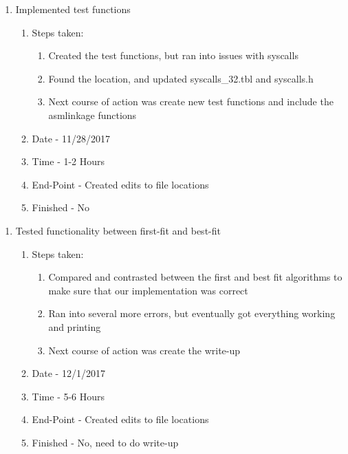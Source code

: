 \documentclass[journal,10pt,onecolumn,compsoc]{IEEEtran} \usepackage[margin=1.0in]{geometry} \usepackage{pdfpages}
\begin{document}
    \begin {enumerate}
    	\item Implemented test functions
        \begin{enumerate}
            \item Steps taken:
        	\begin{enumerate}
                  \item Created the test functions, but ran into issues with syscalls
                  \item Found the location, and updated syscalls\_32.tbl and syscalls.h
                  \item Next course of action was create new test functions and include the asmlinkage functions
     		\end{enumerate}   
            \item Date - 11/28/2017
            \item Time - 1-2 Hours
            \item End-Point - Created edits to file locations
            \item Finished - No  \\
        \end{enumerate}
	\end{enumerate}
    
    \begin {enumerate}
    	\item Tested functionality between first-fit and best-fit
        \begin{enumerate}
            \item Steps taken:
        	\begin{enumerate}
                  \item Compared and contrasted between the first and best fit algorithms to make sure that our implementation was correct
                  \item Ran into several more errors, but eventually got everything working and printing
                  \item Next course of action was create the write-up
     		\end{enumerate}   
            \item Date - 12/1/2017
            \item Time - 5-6 Hours
            \item End-Point - Created edits to file locations
            \item Finished - No, need to do write-up \\
        \end{enumerate}
	\end{enumerate}
    
\end{document}

